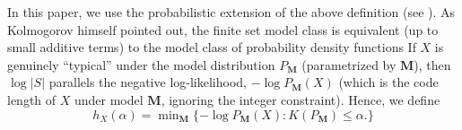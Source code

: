 \documentclass[11pt]{article}
\theoremstyle{plain}
\theoremstyle{definition}
\newcommand{\Model}{\boldsymbol{M}}
\begin{document}
In this paper, we use the probabilistic extension of the above definition
(see \cite{grunwald2003kolmogorov,vereshchagin2004kolmogorov}).
As Kolmogorov himself pointed out, the finite set model class is equivalent (up to small additive terms) to the model class of probability density functions
\citep{vereshchagin2004kolmogorov,gacs2001algorithmic}
If \(X\) is genuinely “typical” under the model distribution \(P_{\Model}\) (parametrized by $\Model$), then \(\log\lvert S\rvert\) parallels the 
negative log-likelihood, \(-\log P_{\Model}(X)\) (which is the code length
of $X$ under model $\Model$, ignoring the integer constraint).
Hence, we define 
$$
h_X(\alpha) = \min\nolimits_{\Model}
\{
-\log P_{\Model}(X) : K(P_{\Model})\leq \alpha.
\}
$$
\end{document}

